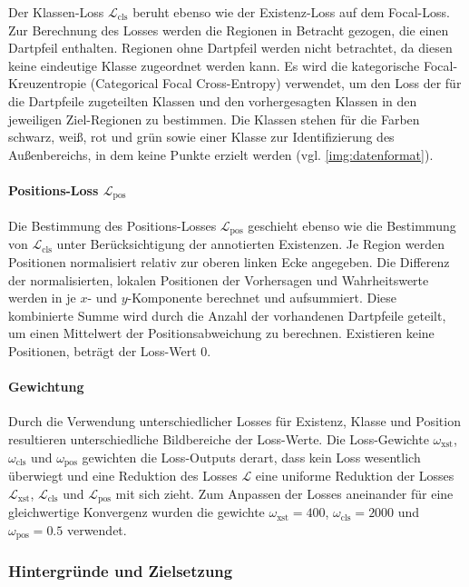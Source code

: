 Der Klassen-Loss $\mathcal{L}_\text{cls}$ beruht ebenso wie der Existenz-Loss auf dem Focal-Loss. Zur Berechnung des Losses werden die Regionen in Betracht gezogen, die einen Dartpfeil enthalten. Regionen ohne Dartpfeil werden nicht betrachtet, da diesen keine eindeutige Klasse zugeordnet werden kann. Es wird die kategorische Focal-Kreuzentropie (Categorical Focal Cross-Entropy) \cite{focal_loss} verwendet, um den Loss der für die Dartpfeile zugeteilten Klassen und den vorhergesagten Klassen in den jeweiligen Ziel-Regionen zu bestimmen. Die Klassen stehen für die Farben schwarz, weiß, rot und grün sowie einer Klasse zur Identifizierung des Außenbereichs, in dem keine Punkte erzielt werden (vgl. \autoref{img:datenformat}).

\paragraph{Positions-Loss $\mathcal{L}_\text{pos}$}

Die Bestimmung des Positions-Losses $\mathcal{L}_\text{pos}$ geschieht ebenso wie die Bestimmung von $\mathcal{L}_\text{cls}$ unter Berücksichtigung der annotierten Existenzen. Je Region werden Positionen normalisiert relativ zur oberen linken Ecke angegeben. Die Differenz der normalisierten, lokalen Positionen der Vorhersagen und Wahrheitswerte werden in je $x$- und $y$-Komponente berechnet und aufsummiert. Diese kombinierte Summe wird durch die Anzahl der vorhandenen Dartpfeile geteilt, um einen Mittelwert der Positionsabweichung zu berechnen. Existieren keine Positionen, beträgt der Loss-Wert 0.

\paragraph{Gewichtung}

Durch die Verwendung unterschiedlicher Losses für Existenz, Klasse und Position resultieren unterschiedliche Bildbereiche der Loss-Werte. Die Loss-Gewichte $\omega_\text{xst}$, $\omega_\text{cls}$ und $\omega_\text{pos}$ gewichten die Loss-Outputs derart, dass kein Loss wesentlich überwiegt und eine Reduktion des Losses $\mathcal{L}$ eine uniforme Reduktion der Losses $\mathcal{L}_\text{xst}$, $\mathcal{L}_\text{cls}$ und $\mathcal{L}_\text{pos}$ mit sich zieht. Zum Anpassen der Losses aneinander für eine gleichwertige Konvergenz wurden die gewichte $\omega_\text{xst} = 400$, $\omega_\text{cls} = 2000$ und $\omega_\text{pos} = 0.5$ verwendet.

\subsubsection{Hintergründe und Zielsetzung}

